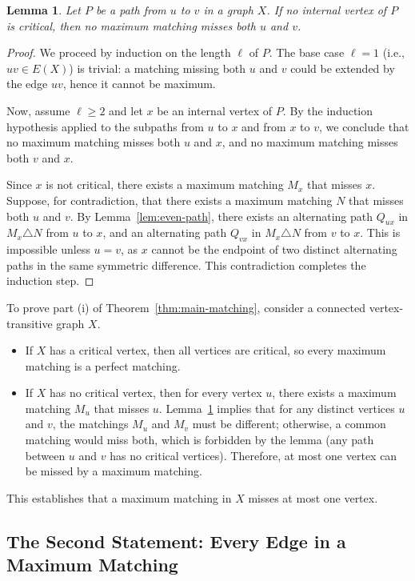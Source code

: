 \documentclass[12pt,a4paper,openany]{book}
\newtheorem{lemma}{Lemma}[section]
\begin{document}
\begin{lemma}\label{lem:critical-path}
Let $P$ be a path from $u$ to $v$ in a graph $X$. If no internal vertex of $P$ is critical, then no maximum matching misses both $u$ and $v$.
\end{lemma}
\begin{proof}
We proceed by induction on the length $\ell$ of $P$. The base case $\ell = 1$ (i.e., $uv \in E(X)$) is trivial: a matching missing both $u$ and $v$ could be extended by the edge $uv$, hence it cannot be maximum.

Now, assume $\ell \geq 2$ and let $x$ be an internal vertex of $P$. By the induction hypothesis applied to the subpaths from $u$ to $x$ and from $x$ to $v$, we conclude that no maximum matching misses both $u$ and $x$, and no maximum matching misses both $v$ and $x$.

Since $x$ is not critical, there exists a maximum matching $M_x$ that misses $x$. Suppose, for contradiction, that there exists a maximum matching $N$ that misses both $u$ and $v$. By Lemma~\ref{lem:even-path}, there exists an alternating path $Q_{ux}$ in $M_x \triangle N$ from $u$ to $x$, and an alternating path $Q_{vx}$ in $M_x \triangle N$ from $v$ to $x$. This is impossible unless $u = v$, as $x$ cannot be the endpoint of two distinct alternating paths in the same symmetric difference. This contradiction completes the induction step.
\end{proof}

To prove part (i) of Theorem~\ref{thm:main-matching}, consider a connected vertex-transitive graph $X$.
\begin{itemize}
    \item If $X$ has a critical vertex, then all vertices are critical, so every maximum matching is a perfect matching.
    \item If $X$ has no critical vertex, then for every vertex $u$, there exists a maximum matching $M_u$ that misses $u$. Lemma~\ref{lem:critical-path} implies that for any distinct vertices $u$ and $v$, the matchings $M_u$ and $M_v$ must be different; otherwise, a common matching would miss both, which is forbidden by the lemma (any path between $u$ and $v$ has no critical vertices). Therefore, at most one vertex can be missed by a maximum matching.
\end{itemize}
This establishes that a maximum matching in $X$ misses at most one vertex.

\subsection*{The Second Statement: Every Edge in a Maximum Matching}
\end{document}
